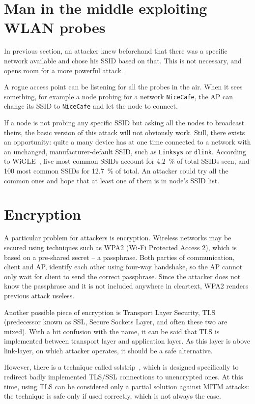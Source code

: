 \documentclass[12pt,a4paper,oneside,pdftex]{report}
\begin{document}
\section{Man in the middle exploiting WLAN probes}
\label{sec:mitm_probes}

In previous section, an attacker knew beforehand that there was a specific network available and chose his SSID based on that. This is not necessary, and opens room for a more powerful attack.

A rogue access point can be listening for all the probes in the air. When it sees something, for example a node probing for a network \texttt{NiceCafe}, the AP can change its SSID to \texttt{NiceCafe} and let the node to connect.

If a node is not probing any specific SSID but asking all the nodes to broadcast theirs, the basic version of this attack will not obviously work. Still, there exists an opportunity: quite a many device has at one time connected to a network with an unchanged, manufacturer-default SSID, such as \texttt{Linksys} or \texttt{dlink}. According to WiGLE~\cite{wigle}, five most common SSIDs account for 4.2~\% of total SSIDs seen, and 100 most common SSIDs for 12.7~\% of total. An attacker could try all the common ones and hope that at least one of them is in node's SSID list.

\section{Encryption}
\label{sec:attack_encryption}

A particular problem for attackers is encryption. Wireless networks may be secured using techniques such as WPA2 (Wi-Fi Protected Access 2), which is based on a pre-shared secret -- a passphrase. Both parties of communication, client and AP, identify each other using four-way handshake, so the AP cannot only wait for client to send the correct passphrase. Since the attacker does not know the passphrase and it is not included anywhere in cleartext, WPA2 renders previous attack useless.

Another possible piece of encryption is Transport Layer Security, TLS (predecessor known as SSL, Secure Sockets Layer, and often these two are mixed). With a bit confusion with the name, it can be said that TLS is implemented between transport layer and application layer. As this layer is above link-layer, on which attacker operates, it should be a safe alternative.

However, there is a technique called sslstrip~\cite{marlinspike2009new}, which is designed specifically to redirect badly implemented TLS/SSL connections to unencrypted ones. At this time, using TLS can be considered only a partial solution against MITM attacks: the technique is safe only if used correctly, which is not always the case.
\end{document}
